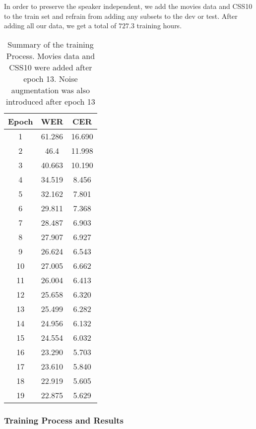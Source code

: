 In order to preserve the speaker independent, we add the movies data and CSS10 to the train set and refrain from adding any subsets to the dev or test. After adding all our data, we get a total of $727.3$ training hours.



\begin{table}[!ht]
\centering
\begin{tabular}{|c|c|c|}
	\hline
	Epoch & WER    & CER    \\ \hline
	1     & 61.286 & 16.690 \\ \hline
	2     & 46.4 & 11.998 \\ \hline
	3     & 40.663 & 10.190 \\ \hline
	4     & 34.519 & 8.456  \\ \hline
	5     & 32.162 & 7.801  \\ \hline
	6     & 29.811 & 7.368  \\ \hline
	7     & 28.487 & 6.903  \\ \hline
	8     & 27.907 & 6.927  \\ \hline
	9     & 26.624 & 6.543  \\ \hline
	10    & 27.005 & 6.662  \\ \hline
	11    & 26.004 & 6.413  \\ \hline
	12    & 25.658 & 6.320  \\ \hline
	13    & 25.499 & 6.282  \\ \hline
	14    & 24.956 & 6.132  \\ \hline
	15    & 24.554 & 6.032  \\ \hline
	16    & 23.290 & 5.703  \\ \hline
	17    & 23.610 & 5.840  \\ \hline
	18    & 22.919 & 5.605  \\ \hline
	19    & 22.875 & 5.629  \\ \hline
\end{tabular}
\caption{Summary of the training Process. Movies data and CSS10 were added after epoch 13. Noise augmentation was also introduced after epoch 13}
\label{meth:table4}
\end{table}




\subsubsection{Training Process and Results}
\label{meth:s4_sub4_subsub3}

